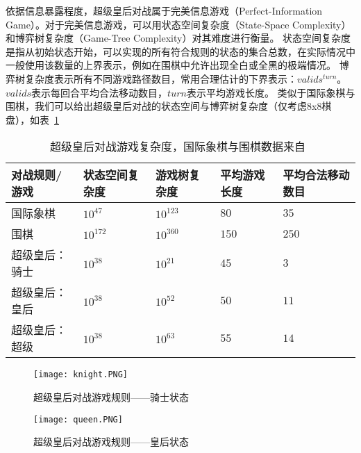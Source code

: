 依据信息暴露程度，超级皇后对战属于完美信息游戏（Perfect-Information Game）\cite{binmore2007game}。对于完美信息游戏，可以用状态空间复杂度（State-Space Complexity）和博弈树复杂度（Game-Tree Complexity）对其难度进行衡量\cite{allis1994searching,VANDENHERIK2002277}。
状态空间复杂度是指从初始状态开始，可以实现的所有符合规则的状态的集合总数，在实际情况中一般使用该数量的上界表示，例如在围棋中允许出现全白或全黑的极端情况。
博弈树复杂度表示所有不同游戏路径数目，常用合理估计的下界表示：$valids^{turn}$。 $valids$表示每回合平均合法移动数目，$turn$表示平均游戏长度\cite{10.1007/BF00992697}。
类似于国际象棋与围棋，我们可以给出超级皇后对战的状态空间与博弈树复杂度（仅考虑8x8棋盘），如表~\ref{table:complexity}
\begin{table}[htb]
  \centering
  \caption[complexity]{超级皇后对战游戏复杂度，国际象棋与围棋数据来自~\cite{enwiki:complexity}}
  \begin{tabular}{p{3cm}<{\centering} p{2cm}<{\centering} p{2cm}<{\centering} p{2cm}<{\centering} p{2cm}<{\centering}}
  \hline
  对战规则/游戏 & 状态空间复杂度 & 游戏树复杂度 & 平均游戏长度 & 平均合法移动数目 \\ \hline
  国际象棋 & $10^{47}$ & $10^{123}$&$80$ &$35$\\ 
      围棋 & $10^{172}$ & $10^{360}$&$150$ &$250$ \\ 
      超级皇后：骑士 & $10^{38}$ & $10^{21}$ &$45$ & $3$\\ 
      超级皇后：皇后 & $10^{38}$ & $10^{52}$ & $50$ & $11$\\ 
      超级皇后：超级 & $10^{38}$ & $10^{63}$ & $55$ & $14$\\ \hline
  \end{tabular}
  \label{table:complexity}
\end{table}

\begin{figure}[H]
    \centering
    \texttt{[image: knight.PNG]}
    \caption[rules-knight]{%
        超级皇后对战游戏规则——骑士状态%
      }
    \label{fig:knight}
\end{figure}

\begin{figure}[H]
    \centering
    \texttt{[image: queen.PNG]}
    \caption[rules-queen]{%
        超级皇后对战游戏规则——皇后状态%
      }
    \label{fig:queen}
\end{figure}

